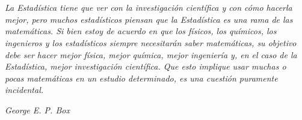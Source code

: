 \section*{}
\thispagestyle{empty}
\setlength\epigraphrule{1pt}
\begin{dedication}

\epigraph{\itshape La Estadística tiene que ver con la investigación científica y con cómo hacerla mejor, pero muchos estadísticos piensan que la Estadística es una rama de las matemáticas. Si bien estoy de acuerdo en que los físicos, los químicos, los ingenieros y los estadísticos siempre necesitarán saber matemáticas, su objetivo debe ser hacer mejor física, mejor química, mejor ingeniería y, en el caso de la Estadística, mejor investigación científica. Que esto implique usar muchas o pocas matemáticas en un estudio determinado, es una cuestión puramente incidental.}{\textit{George E. P. Box}}

\end{dedication}







